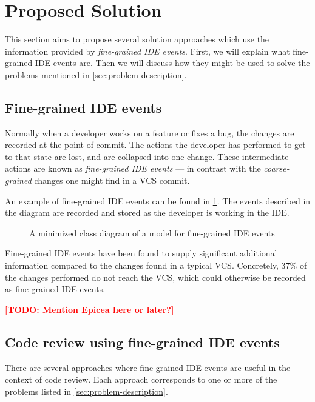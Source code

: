 \documentclass[conference,a4paper]{IEEEtran}
\newcommand{\todo}[1]{\textbf{\textcolor{red}{{[}TODO: #1{]}}}}
\begin{document}
\section{Proposed Solution}
\label{sec:proposed-solution}
This section aims to propose several solution approaches which use the
information provided by \textit{fine-grained IDE events}. First, we
will explain what fine-grained IDE events are. Then we will discuss
how they might be used to solve the problems mentioned in
\cref{sec:problem-description}.

\subsection{Fine-grained IDE events}
\label{sec:fine-grained-ide}

Normally when a developer works on a feature or fixes a bug, the
changes are recorded at the point of commit. The actions the developer
has performed to get to that state are lost, and are collapsed into
one change. These intermediate actions are known as
\textit{fine-grained IDE events} --- in contrast with the
\textit{coarse-grained} changes one might find in a VCS commit.

An example of fine-grained IDE events can be found in
\cref{fig:ide-event-class-model}. The events described in the diagram
are recorded and stored as the developer is working in the IDE.
\begin{figure}[h]
  \centering
  \resizebox{!}{0.3\textheight}{%
    
  }
  \caption{A minimized class diagram of a model for fine-grained IDE
    events}
  \label{fig:ide-event-class-model}
\end{figure}

Fine-grained IDE events have been found to supply significant
additional information compared to the changes found in a typical
VCS. Concretely, 37\% of the changes performed do not reach the
VCS\cite{Nega12a}, which could otherwise be recorded as fine-grained
IDE events.

\todo{Mention Epicea here or later?}

\subsection{Code review using fine-grained IDE events}
\label{sec:code-review-using-1}

There are several approaches where fine-grained IDE events are useful
in the context of code review. Each approach corresponds to one or
more of the problems listed in \cref{sec:problem-description}.
\end{document}

